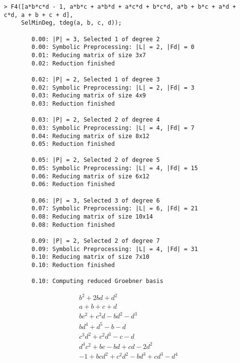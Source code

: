 \begin{Verbatim}[fontsize=\footnotesize]
> F4([a*b*c*d - 1, a*b*c + a*b*d + a*c*d + b*c*d, a*b + b*c + a*d + c*d, a + b + c + d],
     SelMinDeg, tdeg(a, b, c, d));

        0.00: |P| = 3, Selected 1 of degree 2
        0.00: Symbolic Preprocessing: |L| = 2, |Fd| = 0
        0.01: Reducing matrix of size 3x7
        0.02: Reduction finished

        0.02: |P| = 2, Selected 1 of degree 3
        0.02: Symbolic Preprocessing: |L| = 2, |Fd| = 3
        0.03: Reducing matrix of size 4x9
        0.03: Reduction finished

        0.03: |P| = 2, Selected 2 of degree 4
        0.03: Symbolic Preprocessing: |L| = 4, |Fd| = 7
        0.04: Reducing matrix of size 8x12
        0.05: Reduction finished

        0.05: |P| = 2, Selected 2 of degree 5
        0.05: Symbolic Preprocessing: |L| = 4, |Fd| = 15
        0.06: Reducing matrix of size 6x12
        0.06: Reduction finished

        0.06: |P| = 3, Selected 3 of degree 6
        0.07: Symbolic Preprocessing: |L| = 6, |Fd| = 21
        0.08: Reducing matrix of size 10x14
        0.08: Reduction finished

        0.09: |P| = 2, Selected 2 of degree 7
        0.09: Symbolic Preprocessing: |L| = 4, |Fd| = 31
        0.10: Reducing matrix of size 7x10
        0.10: Reduction finished

        0.10: Computing reduced Groebner basis
\end{Verbatim}
\begin{eqnarray*}
	&  b^2+2bd+d^2\\
	&  a+b+c+d\\
	&  bc^2+c^2d-bd^2-d^3\\
	&  bd^4+d^5-b-d\\
	&  c^3d^2+c^2d^3-c-d\\
	&  d^4c^2+bc-bd+cd-2d^2\\
	&  -1+bcd^2+c^2d^2-bd^3+cd^3-d^4
\end{eqnarray*}

